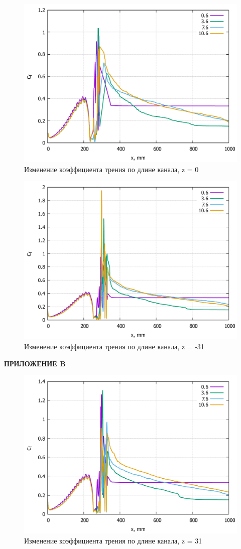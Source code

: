 \appendix
{}
\setcounter{figure}{0}
\begin{figure}[H]
	\centering
	\includegraphics[width=0.8\linewidth]{../Assets/Cf-Tall}
	\caption{Изменение коэффициента трения по длине канала, z = 0}
	\label{fig:cf-tall}
\end{figure}
\begin{figure}[H]
	\centering
	\includegraphics[width=0.8\linewidth]{../Assets/Cf-Tall-31m}
	\caption{Изменение коэффициента трения по длине канала, z = -31}
	\label{fig:cf-tall-31m}
\end{figure}
\newpage
\begin{flushright}
	\MakeUppercase{\textbf{Приложение B}}
\end{flushright}
\begin{figure}[H]
	\centering
	\includegraphics[width=0.8\linewidth]{../Assets/Cf-Tall-31p}
	\caption{Изменение коэффициента трения по длине канала, z = 31}
	\label{fig:cf-tall-31p}
\end{figure}
